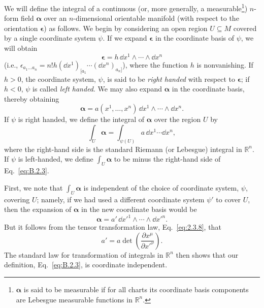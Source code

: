 We will define the integral of a continuous (or, more generally, a
measurable\footnote{\(\boldsymbol\alpha\) is said to be measurable if for all charts
its coordinate basis components are Lebesgue measurable functions in \(\mathbb R^n\).})
\(n\)-form field \(\boldsymbol\alpha\) over an \(n\)-dimensional orientable manifold
(with respect to the orientation \(\boldsymbol\epsilon\)) as follows. We begin by
considering an open region \(U\subseteq M\) covered by a single coordinate system
\(\psi\). If we expand \(\boldsymbol\epsilon\) in the coordinate basis of \(\psi\), we
will obtain
\begin{equation}
  \boldsymbol\epsilon=h\,\dd x^1\wedge\cdots\wedge \dd x^n
  \tag{B.2.1}\label{eq:B.2.1}
\end{equation}
(i.e.,
\(\epsilon_{a_1\ldots a_n}=n!h(\dd x^1)_{[a_1}\cdots(\dd x^n)_{a_n]}\)), where the
function \(h\) is nonvanishing. If \(h>0\), the coordinate system, \(\psi\), is said
to be \emph{right handed} with respect to \(\boldsymbol\epsilon\); if \(h<0\),
\(\psi\) is called \emph{left handed}. We may also expand
\(\boldsymbol\alpha\) in the coordinate basis, thereby obtaining
\begin{equation}
  \boldsymbol\alpha
  =a(x^1,\ldots,x^n)\,\dd x^1\wedge\cdots\wedge \dd x^n.
  \tag{B.2.2}\label{eq:B.2.2}
\end{equation}
If \(\psi\) is right handed, we define the integral of \(\boldsymbol\alpha\) over the
region \(U\) by
\begin{equation}
  \int_U\boldsymbol\alpha
  =\int_{\psi(U)}a\,\dd x^1\cdots \dd x^n,
  \tag{B.2.3}\label{eq:B.2.3}
\end{equation}
where the right-hand side is the standard Riemann (or Lebesgue) integral in
\(\mathbb R^n\). If \(\psi\) is left-handed, we define
\(\int_U\boldsymbol\alpha\) to be minus the right-hand side of
Eq.~\eqref{eq:B.2.3}.

First, we note that \(\int_U\boldsymbol\alpha\) is independent of the choice of
coordinate system, \(\psi\), covering \(U\); namely, if we had used a different
coordinate system \(\psi'\) to cover \(U\), then the expansion of
\(\boldsymbol\alpha\) in the new coordinate basis would be
\begin{equation}
  \boldsymbol\alpha
  =a'\,\dd x'^1\wedge\cdots\wedge \dd x'^n.
  \tag{B.2.4}\label{eq:B.2.4}
\end{equation}
But it follows from the tensor transformation law, Eq.~\eqref{eq:2.3.8}, that
\begin{equation}
  a'=a\det\left(\frac{\partial x^\mu}{\partial x'^\nu}\right).
  \tag{B.2.5}\label{eq:B.2.5}
\end{equation}
The standard law for transformation of integrals in \(\mathbb R^n\) then shows that
our definition, Eq.~\eqref{eq:B.2.3}, is coordinate independent.

